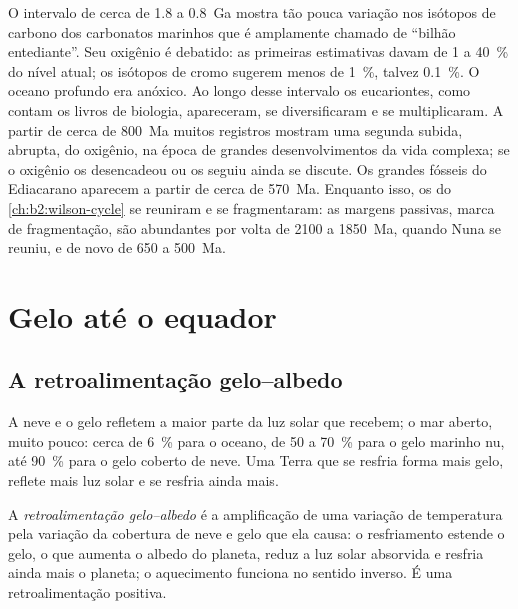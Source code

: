 O intervalo de cerca de 1.8 a \qty{0.8}{Ga} mostra tão pouca variação nos isótopos de carbono dos
carbonatos marinhos que é amplamente chamado de ``bilhão entediante''. Seu oxigênio é debatido: as primeiras
estimativas davam de 1 a \qty{40}{\percent} do nível atual; os isótopos de cromo sugerem menos de
\qty{1}{\percent}, talvez \qty{0.1}{\percent}. O oceano profundo era anóxico. Ao longo desse intervalo
os eucariontes, como contam os livros de biologia, apareceram, se diversificaram e se multiplicaram. A partir de cerca de \qty{800}{Ma} muitos registros mostram
uma segunda subida, abrupta, do oxigênio, na época de grandes desenvolvimentos da vida complexa; se
o oxigênio os desencadeou ou os seguiu ainda se discute. Os grandes fósseis do Ediacarano
aparecem a partir de cerca de \qty{570}{Ma}. Enquanto isso, os  do \cref{ch:b2:wilson-cycle}
se reuniram e se fragmentaram: as margens passivas, marca de fragmentação, são abundantes por volta de 2100 a
\qty{1850}{Ma}, quando Nuna se reuniu, e de novo de 650 a \qty{500}{Ma}.

\section{Gelo até o equador}\label{sec:b2:precambrian-earth:snowball}

\subsection*{A retroalimentação gelo--albedo}

A neve e o gelo refletem a maior parte da luz solar que recebem; o mar aberto, muito pouco: cerca de
\qty{6}{\percent} para o oceano, de 50 a \qty{70}{\percent} para o gelo marinho nu, até
\qty{90}{\percent} para o gelo coberto de neve. Uma Terra que se resfria forma mais gelo, reflete mais
luz solar e se resfria ainda mais.

\begin{definition}\label{def:b2:precambrian-earth:ice-albedo}
A \emph{retroalimentação gelo--albedo} é a amplificação de uma variação
de temperatura pela variação da cobertura de neve e gelo que ela causa: o resfriamento estende o gelo, o que
aumenta o albedo do planeta, reduz a luz solar absorvida e resfria ainda mais o planeta;
o aquecimento funciona no sentido inverso. É uma retroalimentação positiva.
\end{definition}

